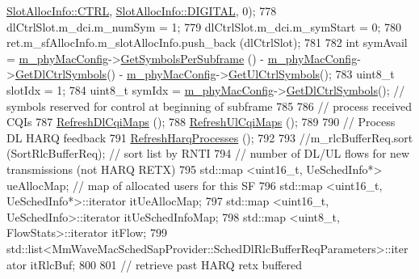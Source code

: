 \begin{DoxyCode}
      \hyperlink{structns3_1_1SlotAllocInfo_a3ea7cb503bfd0c9a4df55a71b81b9331ad78b7d76ef82d56c33be1fa9c1867409}{SlotAllocInfo::CTRL}, \hyperlink{structns3_1_1SlotAllocInfo_adcbd067d82be6260b3399167d8f0b4eca47a67c342db658a08ded9ce4b49417ea}{SlotAllocInfo::DIGITAL}, 0);
778         dlCtrlSlot.m\_dci.m\_numSym = 1;
779         dlCtrlSlot.m\_dci.m\_symStart = 0;
780         ret.m\_sfAllocInfo.m\_slotAllocInfo.push\_back (dlCtrlSlot);
781 
782         \textcolor{keywordtype}{int} symAvail = \hyperlink{classns3_1_1MmWaveMacScheduler_a24d7af4971d2e500fe543cefbafa2fd9}{m\_phyMacConfig}->\hyperlink{classns3_1_1MmWavePhyMacCommon_a2fe835b76e3c689defa413e395cd10cb}{GetSymbolsPerSubframe} () - 
      \hyperlink{classns3_1_1MmWaveMacScheduler_a24d7af4971d2e500fe543cefbafa2fd9}{m\_phyMacConfig}->\hyperlink{classns3_1_1MmWavePhyMacCommon_a1be2da684374de93d7f501aab2441b5a}{GetDlCtrlSymbols}() - 
      \hyperlink{classns3_1_1MmWaveMacScheduler_a24d7af4971d2e500fe543cefbafa2fd9}{m\_phyMacConfig}->\hyperlink{classns3_1_1MmWavePhyMacCommon_aa0bf8af14050bc5dc6513fbc86319a9b}{GetUlCtrlSymbols}();
783         uint8\_t slotIdx = 1;
784         uint8\_t symIdx = \hyperlink{classns3_1_1MmWaveMacScheduler_a24d7af4971d2e500fe543cefbafa2fd9}{m\_phyMacConfig}->\hyperlink{classns3_1_1MmWavePhyMacCommon_a1be2da684374de93d7f501aab2441b5a}{GetDlCtrlSymbols}(); \textcolor{comment}{// symbols
       reserved for control at beginning of subframe}
785 
786         \textcolor{comment}{// process received CQIs}
787         \hyperlink{classns3_1_1MmWaveFlexTtiMaxRateMacScheduler_a6c22516f87400ded1150b2fa468e0d8e}{RefreshDlCqiMaps} ();
788         \hyperlink{classns3_1_1MmWaveFlexTtiMaxRateMacScheduler_a9669a0f6636ea34d7f2d37628c33ad33}{RefreshUlCqiMaps} ();
789 
790         \textcolor{comment}{// Process DL HARQ feedback}
791         \hyperlink{classns3_1_1MmWaveFlexTtiMaxRateMacScheduler_ac0f9ee760cb2fd3ffefd101c2e6234cd}{RefreshHarqProcesses} ();
792 
793         \textcolor{comment}{//m\_rlcBufferReq.sort (SortRlcBufferReq);       // sort list by RNTI}
794         \textcolor{comment}{// number of DL/UL flows for new transmissions (not HARQ RETX)}
795         std::map <uint16\_t, UeSchedInfo*> ueAllocMap;           \textcolor{comment}{// map of allocated users for this SF}
796         std::map <uint16\_t, UeSchedInfo*>::iterator itUeAllocMap;
797         std::map <uint16\_t, UeSchedInfo>::iterator itUeSchedInfoMap;
798         std::map <uint8\_t, FlowStats>::iterator itFlow;
799         std::list<MmWaveMacSchedSapProvider::SchedDlRlcBufferReqParameters>::iterator itRlcBuf;
800 
801         \textcolor{comment}{// retrieve past HARQ retx buffered}

\end{DoxyCode}
